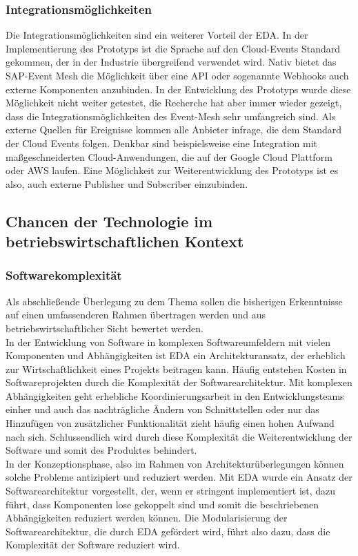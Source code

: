 \subsubsection*{Integrationsmöglichkeiten}
Die Integrationsmöglichkeiten sind ein weiterer Vorteil der \ac{EDA}. In der Implementierung des Prototyps ist die Sprache auf den Cloud-Events Standard gekommen, der in der Industrie übergreifend verwendet wird. Nativ bietet das SAP-Event Mesh die Möglichkeit über eine API oder sogenannte Webhooks auch externe Komponenten anzubinden. In der Entwicklung des Prototyps wurde diese Möglichkeit nicht weiter getestet, die Recherche hat aber immer wieder gezeigt, dass die Integrationsmöglichkeiten des Event-Mesh sehr umfangreich sind. Als externe Quellen für Ereignisse kommen alle Anbieter infrage, die dem Standard der Cloud Events folgen. Denkbar sind beispielsweise eine Integration mit maßgeschneiderten Cloud-Anwendungen, die auf der Google Cloud Plattform oder AWS laufen. Eine Möglichkeit zur Weiterentwicklung des Prototyps ist es also, auch externe Publisher und Subscriber einzubinden.

\subsection{Chancen der Technologie im betriebswirtschaftlichen Kontext}
\subsubsection*{Softwarekomplexität}
Als abschließende Überlegung zu dem Thema sollen die bisherigen Erkenntnisse auf einen umfassenderen Rahmen übertragen werden und aus betriebswirtschaftlicher Sicht bewertet werden. \\
In der Entwicklung von Software in komplexen Softwareumfeldern mit vielen Komponenten und Abhängigkeiten ist \ac{EDA} ein Architekturansatz, der erheblich zur Wirtschaftlichkeit eines Projekts beitragen kann. Häufig entstehen Kosten in Softwareprojekten durch die Komplexität der Softwarearchitektur. Mit komplexen Abhängigkeiten geht erhebliche Koordinierungsarbeit in den Entwicklungsteams einher und auch das nachträgliche Ändern von Schnittstellen oder nur das Hinzufügen von zusätzlicher Funktionalität zieht häufig einen hohen Aufwand nach sich. Schlussendlich wird durch diese Komplexität die Weiterentwicklung der Software und somit des Produktes behindert. \\
In der Konzeptionsphase, also im Rahmen von Architekturüberlegungen können solche Probleme antizipiert und reduziert werden. Mit \ac{EDA} wurde ein Ansatz der Softwarearchitektur vorgestellt, der, wenn er stringent implementiert ist, dazu führt, dass Komponenten lose gekoppelt sind und somit die beschriebenen Abhängigkeiten reduziert werden können. Die Modularisierung der Softwarearchitektur, die durch \ac{EDA} gefördert wird, führt also dazu, dass die Komplexität der Software reduziert wird.\\

